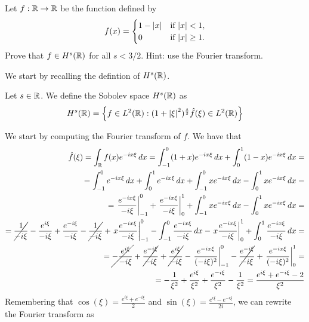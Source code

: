 \newpage
\begin{exercise}
    Let \(f : \mathbb{R} \to \mathbb{R}\) be the function defined by
    \[
        f(x) = \begin{cases}
            1 - \abs{x} & \text{if } \abs{x} < 1, \\
            0 &  \text{if } \abs{x} \geq 1.
        \end{cases}
    \]
    Prove that \(f \in H^s(\mathbb{R})\) for all \(s < 3/2\). Hint: use the Fourier transform.
\end{exercise}
We start by recalling the defintion of \(H^s(\mathbb{R})\).
\begin{remark}
    Let \(s \in \mathbb{R}\). We define the Sobolev space \(H^s(\mathbb{R})\) as 
    \[
        H^s(\mathbb{R}) = \left\{ f \in L^2(\mathbb{R}) : (1 + \abs{\xi}^2)^{\frac{s}{2}} \hat{f}(\xi) \in L^2(\mathbb{R}) \right\}
    \]
\end{remark}
We start by computing the Fourier transform of \(f\). We have that
\[
    \begin{split}
        \hat{f}(\xi) = \int_{\mathbb{R}} f(x) e^{-i x \xi} \, dx = \int_{-1}^0 (1 + x) e^{-i x \xi} \, dx + \int_0^1 (1 - x) e^{-i x \xi} \, dx = \\
        = \int_{-1}^0 e^{-i x \xi} \, dx + \int_0^1 e^{-i x \xi} \, dx + \int_{-1}^0 x e^{-i x \xi} \, dx - \int_0^1 x e^{-i x \xi} \, dx = \\
        = \left.  \frac{e^{-i x \xi}}{-i \xi} \right|_{-1}^0 + \left. \frac{e^{-i x \xi}}{-i \xi} \right|_0^1 + \int_{-1}^0 x e^{-i x \xi} \, dx - \int_0^1 x e^{-i x \xi} \, dx = \\
        = \cancel{\frac{1}{- i \xi}} - \frac{e^{i \xi}}{- i \xi} + \frac{e^{-i \xi}}{- i \xi} - \cancel{\frac{1}{- i \xi}} + \left. x \frac{e^{-i x \xi}}{-i \xi} \right|_{-1}^0 - \int_{-1}^0 \frac{e^{-i x \xi}}{-i \xi} \, dx - \left. x \frac{e^{-i x \xi}}{-i \xi} \right|_0^1 + \int_0^1 \frac{e^{-i x \xi}}{-i \xi} \, dx = \\
        = \cancel{- \frac{e^{i \xi}}{- i \xi}} + \cancel{\frac{e^{-i \xi}}{- i \xi}} + \cancel{\frac{e^{i \xi}}{- i \xi}} - \left. \frac{e^{-i x \xi}}{(-i \xi)^2} \right|_{-1}^0 - \cancel{\frac{e^{-i \xi}}{- i \xi}} + \left. \frac{e^{-i x \xi}}{(-i \xi)^2} \right|_0^1 = \\ 
        = -\frac{1}{\xi^2} + \frac{e^{i \xi}}{\xi^2} + \frac{e^{-i \xi}}{\xi^2} - \frac{1}{\xi^2} = \frac{e^{i \xi} + e^{-i \xi} - 2}{\xi^2}  
    \end{split}
\]
Remembering that \(\cos(\xi) = \frac{e^{i \xi} + e^{-i \xi}}{2}\) and \(\sin(\xi) = \frac{e^{i \xi} - e^{-i \xi}}{2i}\), we can rewrite the Fourier transform as
